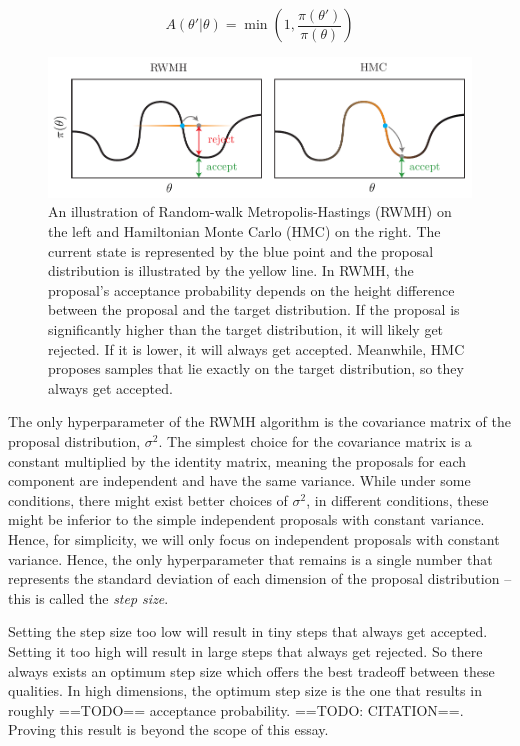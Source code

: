 \documentclass[12pt]{article}
\begin{document}
{\begin{equation}
A(\theta'|\theta) = \min \left(1, \frac{\pi(\theta')}{\pi(\theta)} \right)
\label{eq_rwmh_accept_prob}
\end{equation}

\begin{figure}[ht]
\centering
\includegraphics[width=14cm]{illustrations/rwmh_vs_hmc.pdf}
\caption{An illustration of Random-walk Metropolis-Hastings (RWMH) on the left and Hamiltonian Monte Carlo (HMC) on the right. The current state is represented by the blue point and the proposal distribution is illustrated by the yellow line. In RWMH, the proposal's acceptance probability depends on the height difference between the proposal and the target distribution. If the proposal is significantly higher than the target distribution, it will likely get rejected. If it is lower, it will always get accepted. Meanwhile, HMC proposes samples that lie exactly on the target distribution, so they always get accepted.}
\label{fig_rwmh_vs_hmc}
\end{figure}

The only hyperparameter of the RWMH algorithm is the covariance matrix of the proposal distribution, $\sigma^2$. The simplest choice for the covariance matrix is a constant multiplied by the identity matrix, meaning the proposals for each component are independent and have the same variance. While under some conditions, there might exist better choices of $\sigma^2$, in different conditions, these might be inferior to the simple independent proposals with constant variance. Hence, for simplicity, we will only focus on independent proposals with constant variance. Hence, the only hyperparameter that remains is a single number that represents the standard deviation of each dimension of the proposal distribution -- this is called the \textit{step size}.

Setting the step size too low will result in tiny steps that always get accepted. Setting it too high will result in large steps that always get rejected. So there always exists an optimum step size which offers the best tradeoff between these qualities. In high dimensions, the optimum step size is the one that results in roughly ==TODO== acceptance probability. ==TODO: CITATION==. Proving this result is beyond the scope of this essay.

}
\end{document}
